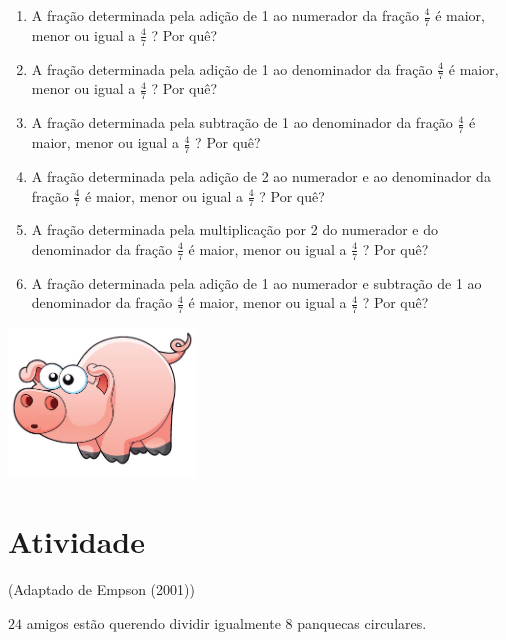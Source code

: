 \documentclass[a4,12pt]{book}
\begin{document}
\begin{enumerate} [\quad a)] %
  \item     A fração determinada pela adição de 1 ao numerador da fração     $\frac{4}{7}$     é maior, menor ou igual a     $\frac{4}{7}$    ? Por quê?
  \item     A fração determinada pela adição de 1 ao denominador da fração     $\frac{4}{7}$     é maior, menor ou igual a     $\frac{4}{7}$    ? Por quê?
  \item     A fração determinada pela subtração de 1 ao denominador da fração     $\frac{4}{7}$     é maior, menor ou igual a     $\frac{4}{7}$    ? Por quê?
  \item     A fração determinada pela adição de 2 ao numerador e ao denominador da fração     $\frac{4}{7}$     é maior, menor ou igual a     $\frac{4}{7}$    ? Por quê?
  \item     A fração determinada pela multiplicação por 2 do numerador e do denominador da fração     $\frac{4}{7}$     é maior, menor ou igual a     $\frac{4}{7}$    ? Por quê?
  \item     A fração determinada pela adição de 1 ao numerador e subtração de 1 ao denominador da fração     $\frac{4}{7}$     é maior, menor ou igual a     $\frac{4}{7}$    ? Por quê?
\end{enumerate} %








\includegraphics[width=\textwidth,height=4cm, keepaspectratio]{pig}
\section{Atividade}







(Adaptado de Empson (2001))

$24$ amigos estão querendo dividir igualmente $8$ panquecas circulares.
\end{document}
